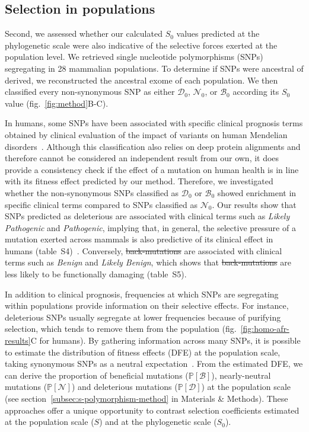 \documentclass{article}
\newcommand{\proba}{\mathbb{P}}
\newcommand{\Sphy}{S_{0}}
\newcommand{\SphyDel}{\mathcal{D}_0}
\newcommand{\SphyNeu}{\mathcal{N}_0}
\newcommand{\SphyBen}{\mathcal{B}_0}
\newcommand{\Spop}{S}
\newcommand{\SpopDel}{\mathcal{D}}
\newcommand{\SpopNeu}{\mathcal{N}}
\newcommand{\SpopBen}{\mathcal{B}}
\newcommand{\ProbaPopDel}{\proba [ \SpopDel]}
\newcommand{\ProbaPopNeu}{\proba [ \SpopNeu ]}
\newcommand{\ProbaPopBen}{\proba [ \SpopBen ]}
\providecommand{\DIFaddtex}[1]{{\protect\color{blue}\uwave{#1}}} %
\providecommand{\DIFdeltex}[1]{{\protect\color{red}\sout{#1}}}                      %
\providecommand{\DIFaddbegin}{} %
\providecommand{\DIFaddend}{} %
\providecommand{\DIFdelbegin}{} %
\providecommand{\DIFdelend}{} %
\providecommand{\DIFadd}[1]{\texorpdfstring{\DIFaddtex{#1}}{#1}} %
\providecommand{\DIFdel}[1]{\texorpdfstring{\DIFdeltex{#1}}{}} %
\newcommand{\DIFscaledelfig}{0.5}
\newlength{\DIFdelgraphicswidth} %
\newlength{\DIFdelgraphicsheight} %
\newcommand{\DIFaddincludegraphics}[2][]{{\color{blue}\fbox{\DIFOincludegraphics[#1]{#2}}}} %
\newcommand{\DIFdelincludegraphics}[2][]{%
\sbox{\DIFdelgraphicsbox}{\DIFOincludegraphics[#1]{#2}}%
\settoboxwidth{\DIFdelgraphicswidth}{\DIFdelgraphicsbox} %
\settoboxtotalheight{\DIFdelgraphicsheight}{\DIFdelgraphicsbox} %
\scalebox{\DIFscaledelfig}{%
\parbox[b]{\DIFdelgraphicswidth}{\usebox{\DIFdelgraphicsbox}\\[-\baselineskip] \rule{\DIFdelgraphicswidth}{0em}}\llap{\resizebox{\DIFdelgraphicswidth}{\DIFdelgraphicsheight}{%
\setlength{\unitlength}{\DIFdelgraphicswidth}%
\begin{picture}(1,1)%
\thicklines\linethickness{2pt} %
{\color[rgb]{1,0,0}\put(0,0){\framebox(1,1){}}}%
{\color[rgb]{1,0,0}\put(0,0){\line( 1,1){1}}}%
{\color[rgb]{1,0,0}\put(0,1){\line(1,-1){1}}}%
\end{picture}%
}\hspace*{3pt}}} %
} %
\DeclareRobustCommand{\DIFaddbegin}{\DIFOaddbegin \let\includegraphics\DIFaddincludegraphics} %
\DeclareRobustCommand{\DIFaddend}{\DIFOaddend \let\includegraphics\DIFOincludegraphics} %
\DeclareRobustCommand{\DIFdelbegin}{\DIFOdelbegin \let\includegraphics\DIFdelincludegraphics} %
\DeclareRobustCommand{\DIFdelend}{\DIFOaddend \let\includegraphics\DIFOincludegraphics} %
\begin{document}
    \subsection*{Selection in populations}
    Second, we assessed whether our calculated $\Sphy$ values predicted at the phylogenetic scale were also indicative of the selective forces exerted at the population level.
    We retrieved single nucleotide polymorphisms (SNPs) segregating in 28 mammalian populations.
    To determine if SNPs were ancestral of derived, we reconstructed the ancestral exome of each population.
    We then classified every non-synonymous SNP as either $\SphyDel$, $\SphyNeu$, or $\SphyBen$ according its $\Sphy$ value (fig.~\ref{fig:method}B-C).

    In humans, some SNPs have been associated with specific clinical prognosis terms obtained by clinical evaluation of the impact of variants on human Mendelian disorders~\cite{landrum_clinvar_2018}.
    Although this classification also relies on deep protein alignments and therefore cannot be considered an independent result from our own, it does provide a consistency check if the effect of a mutation on human health is in line with its fitness effect predicted by our method.
    Therefore, we investigated whether the non-synonymous SNPs classified as $\SphyDel$ or $\SphyBen$ showed enrichment in specific clinical terms compared to SNPs classified as $\SphyNeu$.
    Our results show that SNPs predicted as deleterious are associated with clinical terms such as \textit{Likely Pathogenic} and \textit{Pathogenic}, implying that, in general, the selective pressure of a mutation exerted across mammals is also predictive of its clinical effect in humans (table~S4)~\cite{sullivan_leveraging_2023}.
    Conversely, \DIFdelbegin \DIFdel{back-mutations }\DIFdelend \DIFaddbegin \DIFadd{$\SphyBen$ mutations }\DIFaddend are associated with clinical terms such as \textit{Benign} and \textit{Likely Benign}, which shows that \DIFdelbegin \DIFdel{back-mutations }\DIFdelend \DIFaddbegin \DIFadd{$\SphyBen$ mutations }\DIFaddend are less likely to be functionally damaging (table~S5).

    In addition to clinical prognosis, frequencies at which SNPs are segregating within populations provide information on their selective effects.
    For instance, deleterious SNPs usually segregate at lower frequencies because of purifying selection, which tends to remove them from the population (fig.~\ref{fig:homo-afr-results}C for humans).
    By gathering information across many SNPs, it is possible to estimate the distribution of fitness effects (DFE) at the population scale, taking synonymous SNPs as a neutral expectation~\cite{eyre-walker_distribution_2006, eyre-walker_estimating_2009, galtier_adaptive_2016, tataru_inference_2017}.
    From the estimated DFE, we can derive the proportion of beneficial mutations ($\ProbaPopBen$), nearly-neutral mutations ($\ProbaPopNeu$) and deleterious mutations ($\ProbaPopDel$) at the population scale (see section~\ref{subsec:s-polymorphism-method} in Materials \& Methods).
    These approaches offer a unique opportunity to contrast selection coefficients estimated at the population scale ($\Spop$) and at the phylogenetic scale ($\Sphy$).
\end{document}
